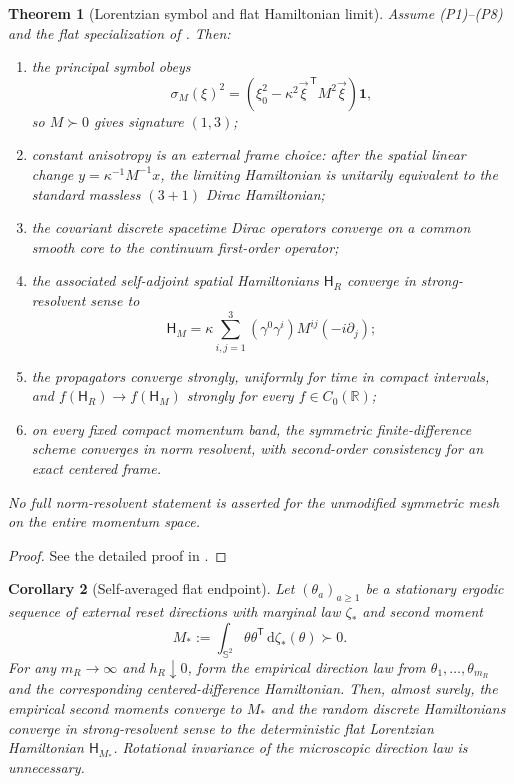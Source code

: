 \documentclass[11pt]{article}
\newtheorem{theorem}{Theorem}[section]
\newtheorem{corollary}[theorem]{Corollary}
\theoremstyle{definition}
\theoremstyle{remark}
\newcommand{\R}{\mathbb R}
\newcommand{\one}{\mathbf 1}
\newcommand{\Ham}{\mathsf H}
\newcommand{\dd}{\mathrm d}
\newcommand{\Sphere}{\mathbb S}
\begin{document}
\begin{theorem}[Lorentzian symbol and flat Hamiltonian limit]
\label{thm:flat-limit}
Assume \textup{(P1)--(P8)} and the flat specialization of
.  Then:
\begin{enumerate}[label=\textup{(\roman*)},leftmargin=2.7em]
\item the principal symbol obeys
      \[
        \boxed{
        \sigma_M(\xi)^2
        =\left(\xi_0^2-
          \kappa^2\vec\xi^{\,\mathsf T}M^2\vec\xi\right)\one,}
      \]
      so $M\succ0$ gives signature $(1,3)$;
\item constant anisotropy is an external frame choice: after the spatial linear
      change $y=\kappa^{-1}M^{-1}x$, the limiting Hamiltonian is unitarily
      equivalent to the standard massless $(3+1)$ Dirac Hamiltonian;
\item the covariant discrete spacetime Dirac operators converge on a common
      smooth core to the continuum first-order operator;
\item the associated self-adjoint spatial Hamiltonians $\Ham_R$ converge in
      strong-resolvent sense to
      \[
        \Ham_M=\kappa\sum_{i,j=1}^3
        (\gamma^0\gamma^i)M^{ij}(-i\partial_j);
      \]
\item the propagators converge strongly, uniformly for time in compact
      intervals, and $f(\Ham_R)\to f(\Ham_M)$ strongly for every
      $f\in C_0(\R)$;
\item on every fixed compact momentum band, the symmetric finite-difference
      scheme converges in norm resolvent, with second-order consistency for an
      exact centered frame.
\end{enumerate}
No full norm-resolvent statement is asserted for the unmodified symmetric mesh
on the entire momentum space.
\end{theorem}

\begin{proof}
See the detailed proof in .
\end{proof}

\begin{corollary}[Self-averaged flat endpoint]
\label{cor:self-averaged-flat}
Let $(\theta_a)_{a\ge1}$ be a stationary ergodic sequence of external reset
directions with marginal law $\zeta_*$ and second moment
\[
  M_*:=\int_{\Sphere^2}\theta\theta^{\mathsf T}\,\dd\zeta_*(\theta)\succ0.
\]
For any $m_R\to\infty$ and $h_R\downarrow0$, form the empirical direction law
from $\theta_1,\ldots,\theta_{m_R}$ and the corresponding centered-difference
Hamiltonian.  Then, almost surely, the empirical second moments converge to
$M_*$ and the random discrete Hamiltonians converge in strong-resolvent sense
to the deterministic flat Lorentzian Hamiltonian $\Ham_{M_*}$.  Rotational
invariance of the microscopic direction law is unnecessary.
\end{corollary}
\end{document}
